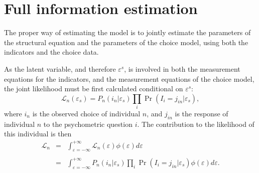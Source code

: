 \documentclass[12pt,a4paper]{article}
\newcommand{\prob}{\operatorname{Pr}}
\begin{document}

\clearpage

\section{Full information estimation}
\label{sec:fi}
The proper way of estimating the model is to jointly estimate the
parameters of the structural equation and the
parameters of the choice model, using both the indicators and the
choice data. 

As the latent variable, and therefore $\varepsilon^s$, is involved in
both the measurement equations for the indicators, and the measurement
equations of the choice model, the joint likelihood must be first
calculated conditional on $\varepsilon^s$:
\begin{equation}
\label{eq:fiLike1}
\mathcal{L}_n(\varepsilon_s) = P_n(i_n|\varepsilon_s) \prod_{i} \prob(I_i = j_{in}|\varepsilon_s),  
\end{equation}
where $i_n$ is the observed choice of individual $n$, and $j_{in}$ is
the response of individual $n$ to the psychometric question  $i$. The
contribution to the likelihood of this individual is then
\begin{equation}
\label{eq:fiLike2}
\begin{array}{rcl}
\mathcal{L}_n &=& \displaystyle\int_{\varepsilon=-\infty}^{+\infty}
\mathcal{L}_n(\varepsilon) \phi(\varepsilon)d\varepsilon \\ && \\
&=& \displaystyle\int_{\varepsilon=-\infty}^{+\infty}P_n(i_n|\varepsilon_s) \prod_{i} \prob(I_i = j_{in}|\varepsilon_s) \phi(\varepsilon)d\varepsilon.
\end{array}
\end{equation}
 
\end{document}
